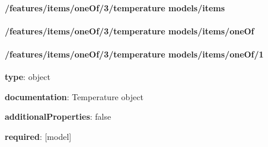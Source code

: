 \begin{itemized}
\paragraph{/features/items/oneOf/3/temperature models/items} \begin{itemized}
\end{itemized}\end{itemized}\paragraph{/features/items/oneOf/3/temperature models/items/oneOf} \begin{itemized}
\end{itemized}\paragraph{/features/items/oneOf/3/temperature models/items/oneOf/1} \begin{itemized}
\item {\bf type}: object
\item {\bf documentation}: Temperature object
\item {\bf additionalProperties}: false
\item {\bf required}: [model]\end{itemized}
